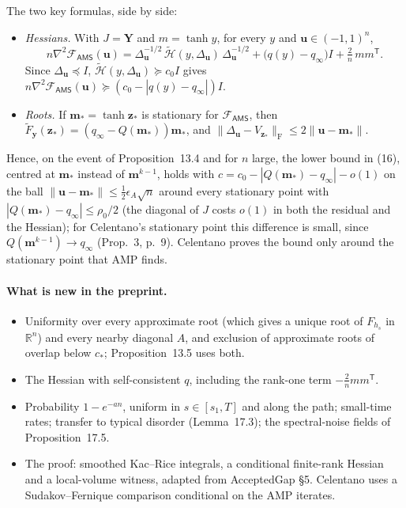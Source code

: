 \documentclass[11pt]{article}
\newcommand{\R}{\mathbb{R}}
\newcommand{\norm}[1]{\lVert #1\rVert}
\newcommand{\ploc}[2]{#1}
\begin{document}
The two key formulas, side by side:
\begin{itemize}
\item \emph{Hessians.} With $J=\mathbf Y$ and $m=\tanh y$, for every $y$ and
 $\mathbf u\in(-1,1)^n$,
 \[
  n\nabla^2\mathcal F_{\mathsf{AMS}}(\mathbf u)
  =\Delta_{\mathbf u}^{-1/2}\,\widetilde{\mathcal H}(y,\Delta_{\mathbf u})\,\Delta_{\mathbf u}^{-1/2}
  +\bigl(q(y)-q_\infty\bigr)I+\tfrac2n\,mm^{\mathsf T}.
 \]
 Since $\Delta_{\mathbf u}\preceq I$,
 $\widetilde{\mathcal H}(y,\Delta_{\mathbf u})\succeq c_0I$ gives
 $n\nabla^2\mathcal F_{\mathsf{AMS}}(\mathbf u)\succeq(c_0-|q(y)-q_\infty|)I$.
\item \emph{Roots.} If $\mathbf m_*=\tanh\mathbf z_*$ is stationary for
 $\mathcal F_{\mathsf{AMS}}$, then
 $\widetilde F_{\mathbf y}(\mathbf z_*)=(q_\infty-Q(\mathbf m_*))\mathbf m_*$, and
 $\norm{\Delta_{\mathbf u}-V_{\mathbf z_*}}_{\mathrm F}\le2\norm{\mathbf u-\mathbf m_*}$.
\end{itemize}
Hence, on the event of Proposition~13.4 and for $n$ large, the lower bound in
(16), centred at $\mathbf m_*$ instead of $\mathbf m^{k-1}$, holds with
$c=c_0-|Q(\mathbf m_*)-q_\infty|-o(1)$ on the ball
$\norm{\mathbf u-\mathbf m_*}\le\frac12\epsilon_A\sqrt n$ around every
stationary point with $|Q(\mathbf m_*)-q_\infty|\le\rho_0/2$ (the diagonal of
$J$ costs $o(1)$ in both the residual and the Hessian); for Celentano's
stationary point this difference is small, since $Q(\mathbf m^{k-1})\to q_\infty$
(Prop.~3, p.~9). Celentano proves the bound only around the stationary point
that AMP finds.

\paragraph{What is new in the preprint.}
\begin{itemize}
\item Uniformity over every approximate root (which gives a unique root of
 $F_{h_s}$ in $\R^n$) and every nearby diagonal $A$, and exclusion of
 approximate roots of overlap below $c_*$; Proposition~13.5 uses both.
\item The Hessian with self-consistent $q$, including the rank-one term
 $-\frac2nmm^{\mathsf T}$.
\item Probability $1-e^{-an}$, uniform in $s\in[s_1,T]$ and along the path;
 small-time rates; transfer to typical disorder (Lemma~17.3); the
 spectral-noise fields of Proposition~17.5.
\item The proof: smoothed Kac--Rice integrals, a conditional finite-rank
 Hessian and a local-volume witness, adapted from
 \ploc{AcceptedGap \S5}{stability.tex}. Celentano uses a Sudakov--Fernique
 comparison conditional on the AMP iterates.
\end{itemize}
\end{document}

